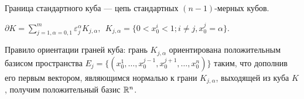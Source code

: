 Граница стандартного куба --- цепь стандартных $(n-1)$-мерных кубов.

$\partial K=\sum\limits_{j=1, \alpha=0,1}^m\varepsilon_j^\alpha K_{j,\alpha},\ \ K_{j,\alpha}=\{0<x_0^i<1;i\ne j, x_0^j=\alpha\}$.

Правило ориентации граней куба: грань $K_{j,\alpha}$ ориентирована положительным базисом пространства $E_j=\{(x_0^1,\ldots,x_0^{j-1},x_0^{j+1},\ldots,x_0^n)\}$ таким, что дополнив его первым вектором, являющимся нормалью к грани $K_{j,\alpha}$, выходящей из куба $K$, получим положительный базис $\mathbb{R}^n$.












